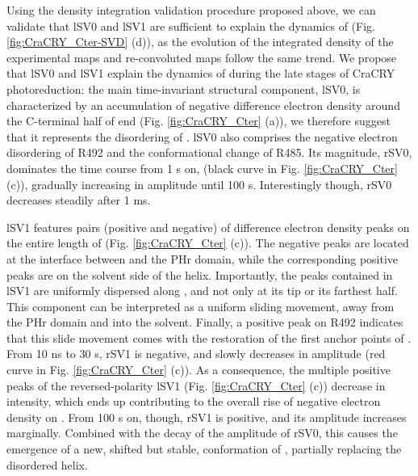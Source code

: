 Using the density integration validation procedure proposed above, we can validate that lSV0 and lSV1 are sufficient to explain the dynamics of  (Fig. \ref{fig:CraCRY_Cter-SVD} (d)), as the evolution of the integrated density of the experimental maps and re-convoluted maps follow the same trend.  We propose that lSV0 and lSV1 explain the dynamics of  during the late stages of CraCRY photoreduction: the main time-invariant structural component, lSV0, is characterized by an accumulation of negative difference electron density around the C-terminal half of  end (Fig. \ref{fig:CraCRY_Cter} (a)), we therefore suggest that it represents the disordering of . lSV0 also comprises the negative electron disordering of R492 and the conformational change of R485. Its magnitude, rSV0, dominates the time course from 1 \textmu s on, (black curve in Fig. \ref{fig:CraCRY_Cter} (c)), gradually increasing in amplitude until 100 \textmu s. Interestingly though, rSV0 decreases steadily after 1 ms. 

lSV1 features pairs (positive and negative) of difference electron density peaks on the entire length of  (Fig. \ref{fig:CraCRY_Cter} (c)). The negative peaks are located at the interface between  and the PHr domain, while the corresponding positive peaks are on the solvent side of the helix. Importantly, the peaks contained in lSV1 are uniformly dispersed along , and not only at its tip or its farthest half. This component can be interpreted as a uniform sliding movement, away from the PHr domain and into the solvent. Finally, a positive peak on R492 indicates that this slide movement comes with the restoration of the first anchor points of .  From 10 ns to 30 \textmu s, rSV1 is negative, and slowly decreases in amplitude (red curve in Fig. \ref{fig:CraCRY_Cter} (c)). As a consequence, the multiple positive peaks of the reversed-polarity lSV1 (Fig. \ref{fig:CraCRY_Cter} (c)) decrease in intensity, which ends up contributing to the overall rise of negative electron density on . From 100 \textmu s on, though, rSV1 is positive, and its amplitude increases marginally. Combined with the decay of the amplitude of rSV0, this causes the emergence of a new, shifted but stable, conformation of , partially replacing the disordered helix. 


